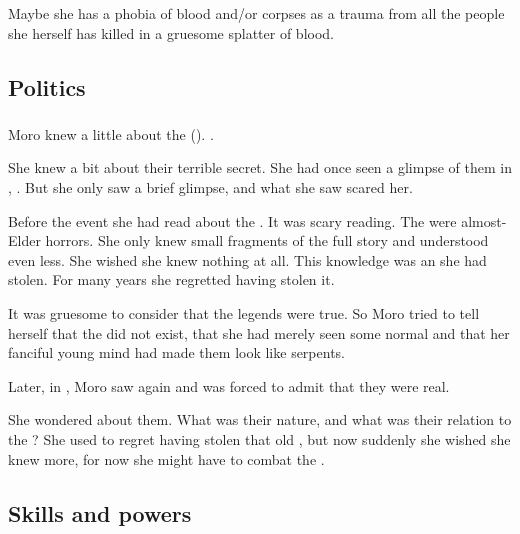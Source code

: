 Maybe she has a phobia of blood and/or corpses as a trauma from all the people she herself has killed in a gruesome splatter of blood. 









\subsection{Politics}





\subsubsection{\QuilJaaran}
Moro \Cornel knew a little about the \quiljaaran (\quo{\serpentmen}). 
. 

She knew a bit about their terrible secret. 
She had once seen a glimpse of them in \Yormis, .
But she only saw a brief glimpse, and what she saw scared her.

Before the event she had read about the \serpentmen.
It was scary reading.
The \serpentmen were almost-\scathaese Elder horrors.
She only knew small fragments of the full story and understood even less.
She wished she knew nothing at all. 
This knowledge was an \arcanum she had stolen. 
For many years she regretted having stolen it. 

It was gruesome to consider that the legends were true. 
So Moro tried to tell herself that the \serpentmen did not exist, that she had merely seen some normal \scathae and that her fanciful young mind had made them look like serpents.

Later, in \Malcur, Moro saw \quiljaaran again and was forced to admit that they were real. 

She wondered about them.
What was their nature, and what was their relation to the \taorthae?
She used to regret having stolen that old \arcanum, but now suddenly she wished she knew more, for now she might have to combat the \serpentmen.









\subsection{Skills and powers}





